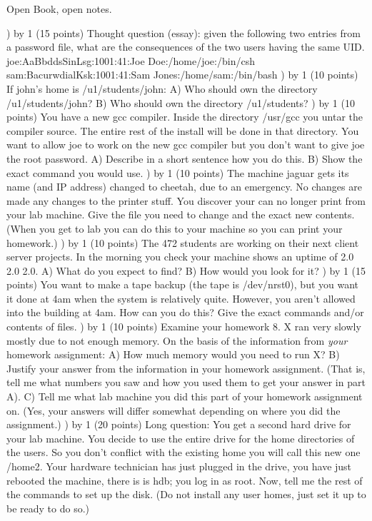 
\parindent=0in
\nopagenumbers
\newcount\quesno
{}
\def\ques{\number\quesno) \advance\quesno by 1}
\def\aspace{\vskip 1.5in}

Open Book, open notes.

\ques
(15 points)
Thought question (essay): given the following two entries from a password file,
what are the consequences of the two users having the same UID.
\hfill\break
{\ltt{}joe:AaBbddsSinLsg:1001:41:Joe Doe:/home/joe:/bin/csh}
\hfill\break
{\ltt{}sam:BacurwdialKsk:1001:41:Sam Jones:/home/sam:/bin/bash}
\vfill
\ques
(10 points)
If john's home is {\ltt{}/u1/students/john}:
\hfill\break
A) Who should own the directory {\ltt{}/u1/students/john}?
\hfill\break
B) Who should own the directory {\ltt{}/u1/students}?
\vskip 1in
\ques
(10 points)
You have a new gcc compiler. Inside the directory {\ltt{}/usr/gcc}
you untar the compiler source.
The entire rest of the install will be done in that directory.
You want to allow {\ltt{}joe} to work on the new gcc compiler
but you don't want to give joe the root password.
\hfill\break
A) Describe in a short sentence how you do this.
\hfill\break
B) Show the exact command you would use.
\vskip 1.5in
\ques
(10 points)
The machine {\ltt{}jaguar} gets its name (and IP address) changed
to {\ltt{}cheetah}, due to an emergency. 
No changes are made any changes to the printer stuff.
You discover your can no longer print from your lab machine.
Give the file you need to change and the exact new contents.
(When you get to lab you can do this to your machine so you can
print your homework.)
\vskip 0.8in\eject
\ques
(10 points)
The 472 students are working on their next client server projects.
In the morning you check your machine shows an uptime of {\ltt{}2.0 2.0 2.0}.
\hfill\break
A) What do you expect to find?
\hfill\break
B) How would you look for it?
\vskip 2in
\ques
(15 points)
You want to make a tape backup (the tape is {\ltt{}/dev/nrst0}),
but you want it done at 4am when the system is relatively quite.
However, you aren't allowed into the building at 4am.
How can you do this?
Give the exact commands and/or contents of files.
\vskip 2in
\ques
(10 points)
Examine your homework 8.
X ran very slowly mostly due to not enough memory.
On the basis of the information from {\it your} homework assignment:
\hfill\break
A) How much memory would you need to run X?
\hfill\break
B) Justify your answer from the information in your homework assignment.
(That is, tell me what numbers you saw and how you used them to get
your answer in part A).
\hfill\break
C) Tell me what lab machine you did this part of your homework assignment
on. (Yes, your answers will differ somewhat depending on where you did 
the assignment.)
\vfill\eject
\ques
(20 points)
Long question: You get a second hard drive for your lab machine.
You decide to use the entire drive for the home directories of the users.
So you don't conflict with the existing home you will call this
new one {\ltt{}/home2}.
Your hardware technician has just plugged in the drive,
you have just rebooted the machine, there is is {\ltt{}hdb};
you log in as root.
Now, tell me the rest of the commands to set up the disk.
(Do not install any user homes, just set it up to be ready to do so.)
\bye
